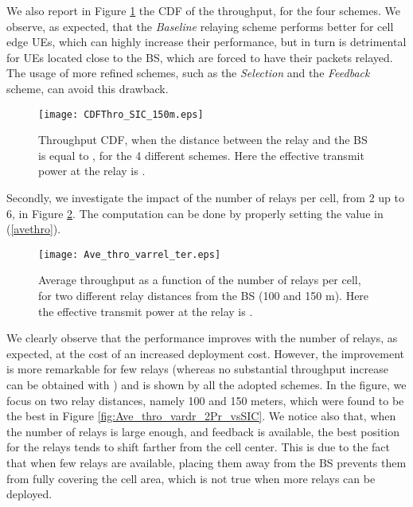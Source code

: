 \documentclass[12pt, letterpaper, onecolumn, draftcls]{IEEEtran}
\newcommand{\figw}{0.55\columnwidth}
\begin{document}
We also report in Figure \ref{fig:CDFThro_SIC_150m} the CDF of the throughput, for the four schemes. We observe, as expected, that the \textit{Baseline} relaying scheme performs better for cell edge UEs, which can highly increase their performance, but in turn is detrimental for UEs located close to the BS, which are forced to have their packets relayed. The usage of more refined schemes, such as the \textit{Selection} and the \textit{Feedback} scheme, can avoid this drawback.
\begin{figure}
    \centering
    \texttt{[image: CDFThro\_SIC\_150m.eps]}
    \vspace{-0.5cm}
     \caption{\small Throughput CDF, when the distance  between the relay and the BS is equal to , for the 4 different schemes. Here the effective transmit power at the relay is .}
\label{fig:CDFThro_SIC_150m}
\end{figure}

Secondly, we investigate the impact of the number of relays per cell, from 2 up to 6, in Figure \ref{fig:Ave_thro_varrel}. The computation can be done by properly setting the value  in (\ref{avethro}).
\begin{figure}
    \centering
    \texttt{[image: Ave\_thro\_varrel\_ter.eps]}
    \vspace{-0.5cm}
     \caption{\small Average throughput as a function of the number of relays per cell, for two different relay distances from the BS (100 and 150 m). Here the effective transmit power at the relay is .}
     \vspace{-1cm}
  \label{fig:Ave_thro_varrel}
\end{figure}
We clearly observe that the performance improves with the number of relays, as expected, at the cost of an increased deployment cost.
However, the improvement is more remarkable for few relays (whereas no substantial throughput increase can be obtained with ) and is shown by all the adopted schemes. In the figure, we focus on two relay distances, namely 100 and 150 meters, which were found to be the best in Figure \ref{fig:Ave_thro_vardr_2Pr_vsSIC}.
We notice also that, when the number of relays is large enough, and feedback is available, the best position for the relays tends to shift farther from the cell center. This is due to the fact that when few relays are available, placing them away from the BS prevents them from fully covering the cell area, which is not true when more relays can be deployed.
\end{document}
